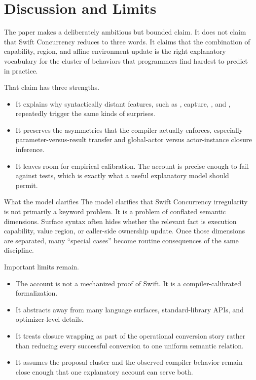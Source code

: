\section{Discussion and Limits}
\label{sec:discussion}

The paper makes a deliberately ambitious but bounded claim. It does not claim that Swift Concurrency reduces to three words. It claims that the combination of capability, region, and affine environment update is the right explanatory vocabulary for the cluster of behaviors that programmers find hardest to predict in practice.

That claim has three strengths.

\begin{itemize}
  \item It explains why syntactically distant features, such as ,  capture, , and , repeatedly trigger the same kinds of surprises.
  \item It preserves the asymmetries that the compiler actually enforces, especially
    parameter-versus-result transfer and global-actor versus actor-instance closure inference.
  \item It leaves room for empirical calibration. The account is precise enough to fail against tests, which is exactly what a useful explanatory model should permit.
\end{itemize}

\begin{propositionbox}{What the model clarifies}
The model clarifies that Swift Concurrency irregularity is not primarily a keyword problem. It is a problem of conflated semantic dimensions. Surface syntax often hides whether the relevant fact is execution capability, value region, or caller-side ownership update. Once those dimensions are separated, many ``special cases'' become routine consequences of the same discipline.
\end{propositionbox}

Important limits remain.

\begin{itemize}
  \item The account is not a mechanized proof of Swift. It is a compiler-calibrated formalization.
  \item It abstracts away from many language surfaces, standard-library APIs, and optimizer-level details.
  \item It treats closure wrapping as part of the operational conversion story rather than reducing every successful conversion to one uniform semantic relation.
  \item It assumes the proposal cluster and the observed compiler behavior remain close enough that one explanatory account can serve both.
\end{itemize}

